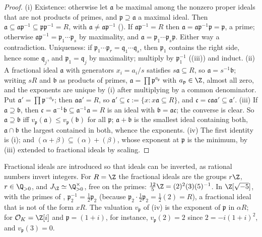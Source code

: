 \begin{proof}
(i) Existence: otherwise let $\mathfrak a$ be maximal among the nonzero proper ideals that are not products of primes, and $\mathfrak p\supseteq\mathfrak a$ a
maximal ideal. Then $\mathfrak a\subseteq\mathfrak a\mathfrak p^{-1}\subseteq\mathfrak p\mathfrak p^{-1}=R$, with $\mathfrak a\ne\mathfrak a\mathfrak p^{-1}$
(). If $\mathfrak a\mathfrak p^{-1}=R$ then $\mathfrak a=\mathfrak a\mathfrak p^{-1}\mathfrak p=\mathfrak p$, a prime; otherwise
$\mathfrak a\mathfrak p^{-1}=\mathfrak p_1\cdots\mathfrak p_s$ by maximality, and $\mathfrak a=\mathfrak p_1\cdots\mathfrak p_s\mathfrak p$. Either way a contradiction.
Uniqueness: if $\mathfrak p_1\cdots\mathfrak p_r=\mathfrak q_1\cdots\mathfrak q_s$, then $\mathfrak p_1$ contains the right side, hence some $\mathfrak q_j$, and
$\mathfrak p_1=\mathfrak q_j$ by maximality; multiply by $\mathfrak p_1^{-1}$ ((iii)) and induct.
(ii) A fractional ideal $\mathfrak a$ with generators $x_i=a_i/s$ satisfies $s\mathfrak a\subseteq R$, so $\mathfrak a=s^{-1}\mathfrak b$; writing $sR$ and
$\mathfrak b$ as products of primes, $\mathfrak a=\prod\mathfrak p^{a_{\mathfrak p}}$ with $a_{\mathfrak p}\in\Z$, almost all zero, and the exponents are unique
by (i) after multiplying by a common denominator. Put $\mathfrak a'=\prod\mathfrak p^{-a_{\mathfrak p}}$; then $\mathfrak a\mathfrak a'=R$, so $\mathfrak a'\subseteq
\mathfrak c:=\{x:x\mathfrak a\subseteq R\}$, and $\mathfrak c=\mathfrak c\mathfrak a\mathfrak a'\subseteq\mathfrak a'$. (iii) If $\mathfrak a\supseteq\mathfrak b$,
then $\mathfrak c=\mathfrak a^{-1}\mathfrak b\subseteq\mathfrak a^{-1}\mathfrak a=R$ is an ideal with $\mathfrak b=\mathfrak a\mathfrak c$; the converse is clear. So
$\mathfrak a\supseteq\mathfrak b$ iff $v_{\mathfrak p}(\mathfrak a)\le v_{\mathfrak p}(\mathfrak b)$ for all $\mathfrak p$; $\mathfrak a+\mathfrak b$ is the smallest
ideal containing both, $\mathfrak a\cap\mathfrak b$ the largest contained in both, whence the exponents. (iv) The first identity is (i); and
$(\alpha+\beta)\subseteq(\alpha)+(\beta)$, whose exponent at $\mathfrak p$ is the minimum, by (iii) extended to fractional ideals by scaling.
\end{proof}

Fractional ideals are introduced so that ideals can be inverted, as rational numbers invert integers. For $R=\Z$ the fractional ideals are the groups
$r\Z$, $r\in\Q_{>0}$, and $J_\Z\simeq\Q_{>0}^\times$, free on the primes: $\frac{12}5\Z=(2)^2(3)(5)^{-1}$. In $\Z[\sqrt{-5}]$, with the primes of
, $\mathfrak p_2^{-1}=\frac12\mathfrak p_2$ (because $\mathfrak p_2\cdot\frac12\mathfrak p_2=\frac12(2)=R$), a fractional ideal that is not
of the form $xR$. The valuation $v_{\mathfrak p}$ of (iv) is the exponent of $\mathfrak p$ in $\alpha R$; for $\mathcal O_K=\Z[i]$ and $\mathfrak p=(1+i)$, for
instance, $v_{\mathfrak p}(2)=2$ since $2=-i(1+i)^2$, and $v_{\mathfrak p}(3)=0$.

